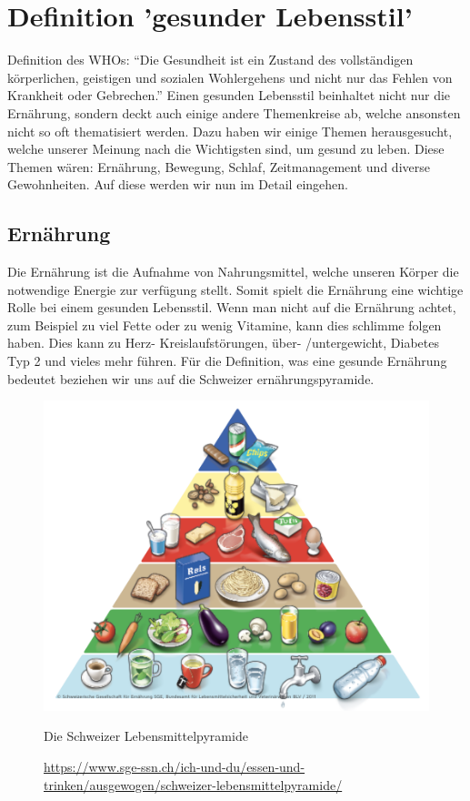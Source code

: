 \chapter{Definition 'gesunder Lebensstil'}
Definition des WHOs: “Die Gesundheit ist ein Zustand des vollständigen körperlichen, geistigen und sozialen Wohlergehens und nicht nur das Fehlen von Krankheit oder Gebrechen.”
Einen gesunden Lebensstil beinhaltet nicht nur die Ernährung, sondern deckt auch einige andere Themenkreise ab, welche ansonsten nicht so oft thematisiert werden. Dazu haben wir einige Themen herausgesucht, welche unserer Meinung nach die Wichtigsten sind, um gesund zu leben. Diese Themen wären: Ernährung, Bewegung, Schlaf, Zeitmanagement und diverse Gewohnheiten. Auf diese werden wir nun im Detail eingehen.
\section{Ernährung}
Die Ernährung ist die Aufnahme von Nahrungsmittel, welche unseren Körper die notwendige Energie zur verfügung stellt. Somit spielt die Ernährung eine wichtige Rolle bei einem gesunden Lebensstil. Wenn man nicht auf die Ernährung achtet, zum Beispiel zu viel Fette oder zu wenig Vitamine, kann dies schlimme folgen haben. Dies kann zu Herz- Kreislaufstörungen, über- /untergewicht, Diabetes Typ 2 und vieles mehr führen.
\newline
Für die Definition, was eine gesunde Ernährung bedeutet beziehen wir uns auf die Schweizer ernährungspyramide.
\begin{figure}[!ht]
  \centering
  \includegraphics[width=0.5\linewidth]{./images/lebensmittelpyramide.png}
  \caption{Die Schweizer Lebensmittelpyramide}
  \label{fig:pyramide}
  \caption*{\url{https://www.sge-ssn.ch/ich-und-du/essen-und-trinken/ausgewogen/schweizer-lebensmittelpyramide/}}
\end{figure}
